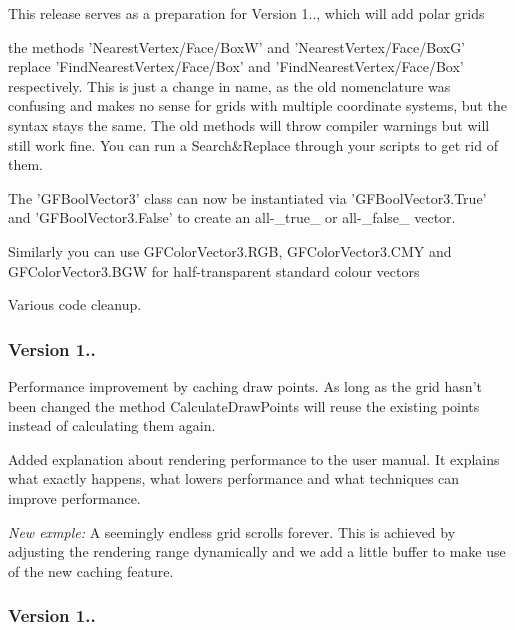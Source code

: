 This release serves as a preparation for Version 1.., which will add polar grids
\begin{DoxyItemize}
\item the methods 'Nearest\+Vertex/\+Face/\+Box\+W' and 'Nearest\+Vertex/\+Face/\+Box\+G' replace 'Find\+Nearest\+Vertex/\+Face/\+Box' and 'Find\+Nearest\+Vertex/\+Face/\+Box' respectively. This is just a change in name, as the old nomenclature was confusing and makes no sense for grids with multiple coordinate systems, but the syntax stays the same. The old methods will throw compiler warnings but will still work fine. You can run a Search\&Replace through your scripts to get rid of them.
\item The 'G\+F\+Bool\+Vector3' class can now be instantiated via 'G\+F\+Bool\+Vector3.\+True' and 'G\+F\+Bool\+Vector3.\+False' to create an all-\/\+\_\+true\+\_\+ or all-\/\+\_\+false\+\_\+ vector.
\item Similarly you can use {\ttfamily G\+F\+Color\+Vector3.\+R\+G\+B}, {\ttfamily G\+F\+Color\+Vector3.\+C\+M\+Y} and {\ttfamily G\+F\+Color\+Vector3.\+B\+G\+W} for half-\/transparent standard colour vectors
\item Various code cleanup.
\end{DoxyItemize}

\subsubsection*{Version 1..}


\begin{DoxyItemize}
\item Performance improvement by caching draw points. As long as the grid hasn't been changed the method Calculate\+Draw\+Points will reuse the existing points instead of calculating them again.
\item Added explanation about rendering performance to the user manual. It explains what exactly happens, what lowers performance and what techniques can improve performance.
\item {\itshape New exmple\+:} A seemingly endless grid scrolls forever. This is achieved by adjusting the rendering range dynamically and we add a little buffer to make use of the new caching feature.
\end{DoxyItemize}

\subsubsection*{Version 1..}


